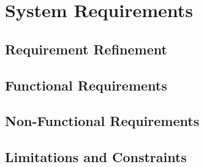 \chapter{System Requirements}
\label{Chapter:SystemRequirements}

\section{Requirement Refinement}

\section{Functional Requirements}

\section{Non-Functional Requirements}

\section{Limitations and Constraints}